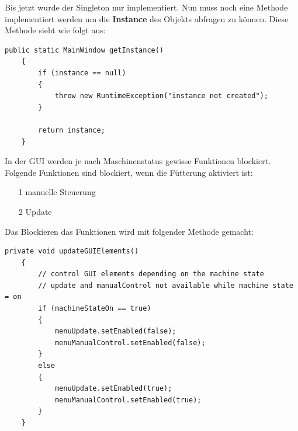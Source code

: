 \newpage

Bis jetzt wurde der Singleton nur implementiert. Nun muss noch eine Methode implementiert werden um die \textbf{Instance} des Objekts abfragen zu können. Diese Methode sieht wie folgt aus:
\begin{lstlisting}[style=JavaStyle, caption=MainWindow.getInstance()]
public static MainWindow getInstance()
    {
        if (instance == null)
        {
            throw new RuntimeException("instance not created");
        }

        return instance;
    }
\end{lstlisting}

\vspace{10pt}

In der \ac{GUI} werden je nach Maschinenstatus gewisse Funktionen blockiert. Folgende Funktionen sind blockiert, wenn die Fütterung aktiviert ist:
\begin{itemize}
\item[1] manuelle Steuerung
\item[2] Update
\end{itemize}
Das Blockieren das Funktionen wird mit folgender Methode gemacht:
\begin{lstlisting}[style=JavaStyle, caption=GUI Elemente blockieren]
private void updateGUIElements()
    {
        // control GUI elements depending on the machine state
        // update and manualControl not available while machine state = on 
        if (machineStateOn == true)
        {
            menuUpdate.setEnabled(false);
            menuManualControl.setEnabled(false);
        }
        else
        {
            menuUpdate.setEnabled(true);
            menuManualControl.setEnabled(true);
        }
    }
\end{lstlisting}

\newpage

